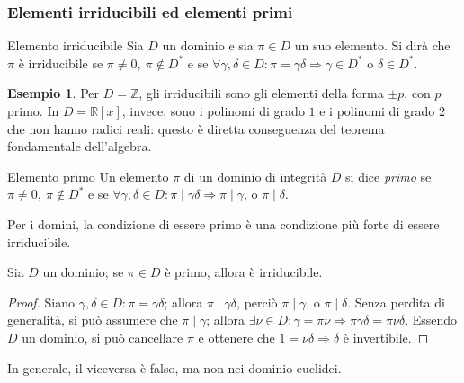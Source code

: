\documentclass[11pt, a4paper]{scrartcl}
\theoremstyle{definition}
\newtheorem{esempio}{Esempio}
\numberwithin{esempio}{section}
\theoremstyle{definition}
\numberwithin{obs}{section}
\numberwithin{nota}{section}
\numberwithin{equation}{subsection}
\begin{document}
\subsubsection{Elementi irriducibili ed elementi primi}
\begin{definizione}
	{Elemento irriducibile}{}
	Sia $D$ un dominio e sia $\pi \in D$ un suo elemento.
	Si dir\`a che $\pi$ \`e irriducibile se $\pi \neq 0, \ \pi\not \in D^*$ e se $\forall \gamma,\delta  \in D : \pi = \gamma \delta  \Rightarrow \gamma\in D^*$ o $\delta \in D^*$.
\end{definizione}
\begin{esempio}
Per $D = \mathbb{Z}$, gli irriducibili sono gli elementi della forma $\pm p$, con $p$ primo.
In $D = \mathbb{R}[x]$, invece, sono i polinomi di grado $1$ e i polinomi di grado $2$ che non hanno radici reali: questo \`e diretta conseguenza del teorema fondamentale dell'algebra.
\end{esempio} 
\begin{definizione}
	{Elemento primo}{}
	Un elemento $\pi$ di un dominio di integrit\`a $D$ si dice \textit{primo} se $\pi\neq 0, \ \pi\not\in D^*$ e se $\forall \gamma,\delta \in D : \pi  \mid \gamma\delta \Rightarrow  \pi  \mid  \gamma$, o $\pi  \mid  \delta $.
\end{definizione}
\noindent Per i domini, la condizione di essere primo \`e una condizione pi\`u forte di essere irriducibile.
\begin{prop}
	{}{}
	Sia $D$ un dominio; se $\pi \in D$ \`e primo, allora \`e irriducibile.
	\begin{proof}
		Siano $\gamma, \delta \in D : \pi = \gamma\delta $; allora $\pi  \mid \gamma\delta $, perci\`o $\pi  \mid  \gamma$, o $\pi \mid \delta $.
		Senza perdita di generalit\`a, si pu\`o assumere che $\pi  \mid  \gamma$; allora $\exists \nu \in D : \gamma = \pi \nu  \Rightarrow \pi \gamma \delta  = \pi \nu  \delta$.
		Essendo $D$ un dominio, si pu\`o cancellare $\pi$ e ottenere che $1 = \nu  \delta \Rightarrow  \delta $ \`e invertibile.
	\end{proof}
\end{prop}
\noindent 	In generale, il viceversa \`e falso, ma non nei dominio euclidei.
\end{document}
